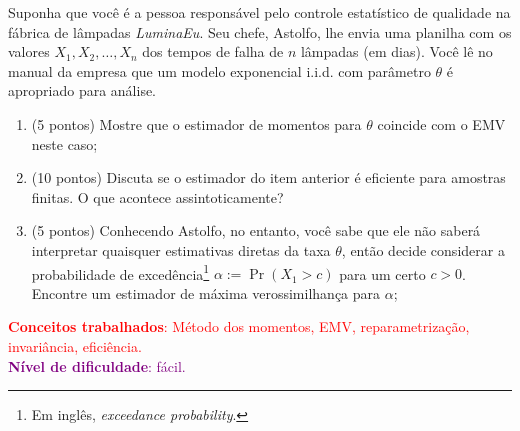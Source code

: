 \documentclass[a4paper,10pt, notitlepage]{report}
\newcommand{\pr}{\operatorname{Pr}} %
\newcommand{\rs}{X_1, X_2, \ldots, X_n} %
\begin{document}
Suponha que você é a pessoa responsável pelo controle estatístico de qualidade na fábrica de lâmpadas \textit{LuminaEu}.
Seu chefe, Astolfo, lhe envia uma planilha com os valores $\rs$ dos tempos de falha de $n$ lâmpadas (em dias).
Você lê no manual da empresa que um modelo exponencial i.i.d. com parâmetro $\theta$ é apropriado para análise.

\begin{enumerate}[label=\alph*)]
 \item (5 pontos) Mostre que o estimador de momentos para $\theta$ coincide com o EMV neste caso;
 \item (10 pontos) Discuta se o estimador do item anterior é eficiente para amostras finitas.
 O que acontece assintoticamente?
 \item (5 pontos) Conhecendo Astolfo, no entanto, você sabe que ele não saberá interpretar quaisquer estimativas diretas da taxa $\theta$, então decide considerar a probabilidade de excedência\footnote{Em inglês, \textit{exceedance probability}.} $\alpha := \pr(X_1 > c)$ para um certo $c > 0$.
 Encontre um estimador de máxima verossimilhança para $\alpha$;
\end{enumerate}
\textcolor{red}{\textbf{Conceitos trabalhados}: Método dos momentos, EMV, reparametrização, invariância, eficiência.}
\\
\textcolor{purple}{\textbf{Nível de dificuldade}: fácil.}
\\
\end{document}
